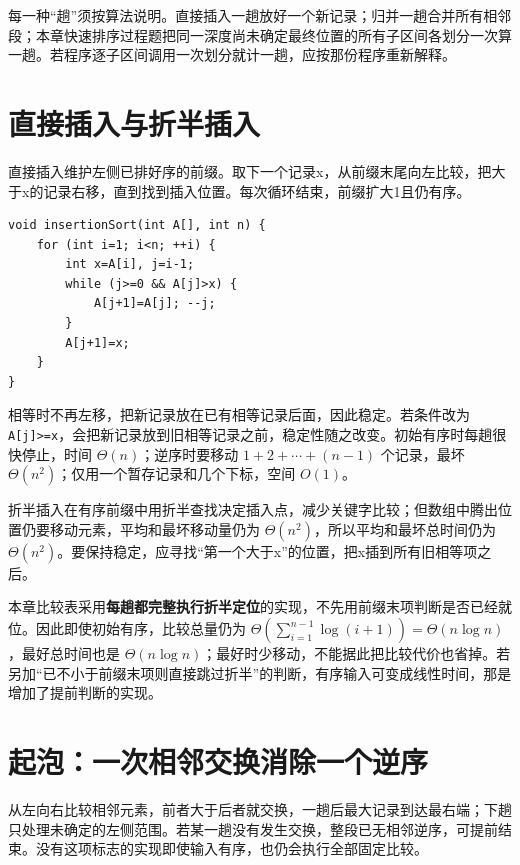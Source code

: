 每一种``趟''须按算法说明。直接插入一趟放好一个新记录；归并一趟合并所有相邻段；本章快速排序过程题把同一深度尚未确定最终位置的所有子区间各划分一次算一趟。若程序逐子区间调用一次划分就计一趟，应按那份程序重新解释。

\section{直接插入与折半插入}\label{ds-08-02}

直接插入维护左侧已排好序的前缀。取下一个记录x，从前缀末尾向左比较，把大于x的记录右移，直到找到插入位置。每次循环结束，前缀扩大1且仍有序。

\par\medskip\noindent
\begin{minipage}{\linewidth}
\begin{verbatim}
void insertionSort(int A[], int n) {
    for (int i=1; i<n; ++i) {
        int x=A[i], j=i-1;
        while (j>=0 && A[j]>x) {
            A[j+1]=A[j]; --j;
        }
        A[j+1]=x;
    }
}
\end{verbatim}
\end{minipage}\par\medskip

相等时不再左移，把新记录放在已有相等记录后面，因此稳定。若条件改为 \texttt{A{[}j{]}\textgreater{}=x}，会把新记录放到旧相等记录之前，稳定性随之改变。初始有序时每趟很快停止，时间 \(\Theta(n)\)；逆序时要移动 \(1+2+\cdots+(n-1)\) 个记录，最坏 \(\Theta(n^2)\)；仅用一个暂存记录和几个下标，空间 \(O(1)\)。

折半插入在有序前缀中用折半查找决定插入点，减少关键字比较；但数组中腾出位置仍要移动元素，平均和最坏移动量仍为 \(\Theta(n^2)\)，所以平均和最坏总时间仍为 \(\Theta(n^2)\)。要保持稳定，应寻找``第一个大于x''的位置，把x插到所有旧相等项之后。

本章比较表采用\textbf{每趟都完整执行折半定位}的实现，不先用前缀末项判断是否已经就位。因此即使初始有序，比较总量仍为 \(\Theta(\sum_{i=1}^{n-1}\log(i+1))=\Theta(n\log n)\)，最好总时间也是 \(\Theta(n\log n)\)；最好时少移动，不能据此把比较代价也省掉。若另加``已不小于前缀末项则直接跳过折半''的判断，有序输入可变成线性时间，那是增加了提前判断的实现。

\section{起泡：一次相邻交换消除一个逆序}\label{ds-08-03}

从左向右比较相邻元素，前者大于后者就交换，一趟后最大记录到达最右端；下趟只处理未确定的左侧范围。若某一趟没有发生交换，整段已无相邻逆序，可提前结束。没有这项标志的实现即使输入有序，也仍会执行全部固定比较。

